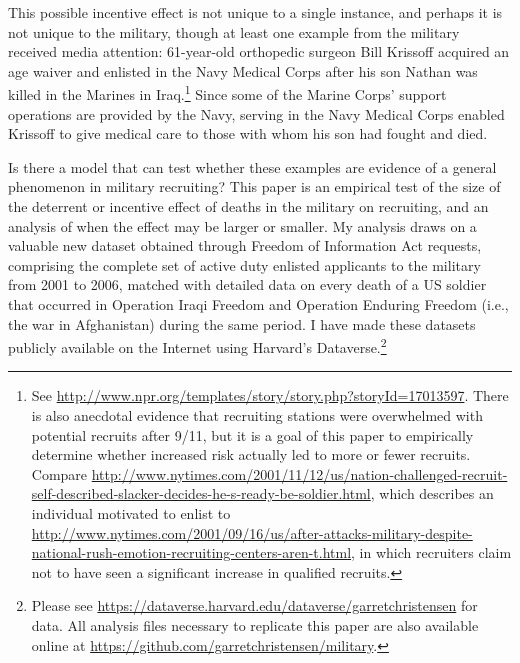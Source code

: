 \documentclass[12pt] {article}
\begin{document}
This possible incentive effect is not unique to a single instance, and perhaps it is not unique to the military, though at least one example from the military received media attention: 61-year-old orthopedic surgeon Bill Krissoff acquired an age waiver and enlisted in the Navy Medical Corps after his son Nathan was killed in the Marines in Iraq.\footnote{See \url{http://www.npr.org/templates/story/story.php?storyId=17013597}.  There is also anecdotal evidence that recruiting stations were overwhelmed with potential recruits
after 9/11, but it is a goal of this paper to empirically determine whether increased risk actually led to more or fewer recruits. Compare \url{http://www.nytimes.com/2001/11/12/us/nation-challenged-recruit-self-described-slacker-decides-he-s-ready-be-soldier.html},
which describes an individual motivated to enlist to \url{http://www.nytimes.com/2001/09/16/us/after-attacks-military-despite-national-rush-emotion-recruiting-centers-aren-t.html}, in which recruiters claim not to have seen a significant increase
in qualified recruits.} Since some of the Marine Corps' support operations are provided by the Navy, serving in the Navy Medical Corps enabled Krissoff to give medical care to those with whom his son had fought and died. 

Is there a model that can test whether these examples are evidence of a general phenomenon in military recruiting? This paper is an empirical test of the size of the deterrent or incentive effect of deaths in the military on recruiting, and an analysis of when the effect may be larger or smaller. My analysis draws on a valuable new dataset obtained through Freedom of Information Act requests, comprising the complete set of active duty enlisted applicants to the military from 2001 to 2006, matched with detailed data on every death of a US soldier that occurred in Operation Iraqi Freedom and Operation
Enduring Freedom (i.e., the war in Afghanistan) during the same period. I have made these datasets publicly available on the Internet using Harvard's Dataverse.\footnote{Please see \url{https://dataverse.harvard.edu/dataverse/garretchristensen} for data. All analysis files necessary to replicate this paper are also available online at \url{https://github.com/garretchristensen/military}.}
\end{document}

